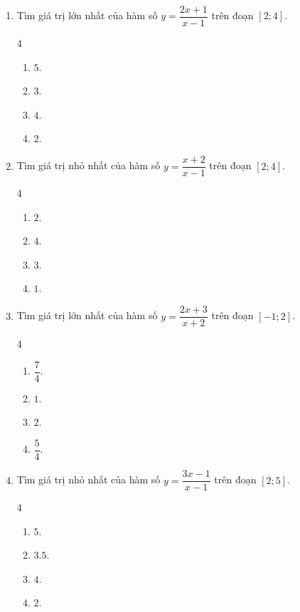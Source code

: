 \documentclass[12pt]{article}
\begin{document}
\begin{enumerate}[label=\textbf{Câu \arabic*.}]
		\item Tìm giá trị lớn nhất của hàm số $y = \dfrac{2x + 1}{x - 1}$ trên đoạn $[2; 4]$.
		\begin{multicols}{4}
			\begin{enumerate}[label=\textbf{\Alph*.}]
				\item $5$.
				\item $3$.
				\item $4$.
				\item $2$.
			\end{enumerate}
		\end{multicols}
		
		\item Tìm giá trị nhỏ nhất của hàm số $y = \dfrac{x + 2}{x - 1}$ trên đoạn $[2; 4]$.
		\begin{multicols}{4}
			\begin{enumerate}[label=\textbf{\Alph*.}]
				\item $2$.
				\item $4$.
				\item $3$.
				\item $1$.
			\end{enumerate}
		\end{multicols}
		
		\item Tìm giá trị lớn nhất của hàm số $y = \dfrac{2x + 3}{x + 2}$ trên đoạn $[-1; 2]$.
		\begin{multicols}{4}
			\begin{enumerate}[label=\textbf{\Alph*.}]
				\item $\dfrac{7}{4}$.
				\item $1$.
				\item $2$.
				\item $\dfrac{5}{4}$.
			\end{enumerate}
		\end{multicols}
		
		\item Tìm giá trị nhỏ nhất của hàm số $y = \dfrac{3x - 1}{x - 1}$ trên đoạn $[2; 5]$.
		\begin{multicols}{4}
			\begin{enumerate}[label=\textbf{\Alph*.}]
				\item $5$.
				\item $3.5$.
				\item $4$.
				\item $2$.
			\end{enumerate}
		\end{multicols}
		

\end{enumerate}
\end{document}

